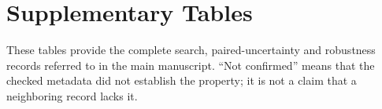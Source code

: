 \documentclass[10pt,twocolumn]{article}
\begin{document}
\section*{Supplementary Tables}
\noindent These tables provide the complete search, paired-uncertainty and robustness records referred to in the main manuscript. ``Not confirmed'' means that the checked metadata did not establish the property; it is not a claim that a neighboring record lacks it.



\end{document}

